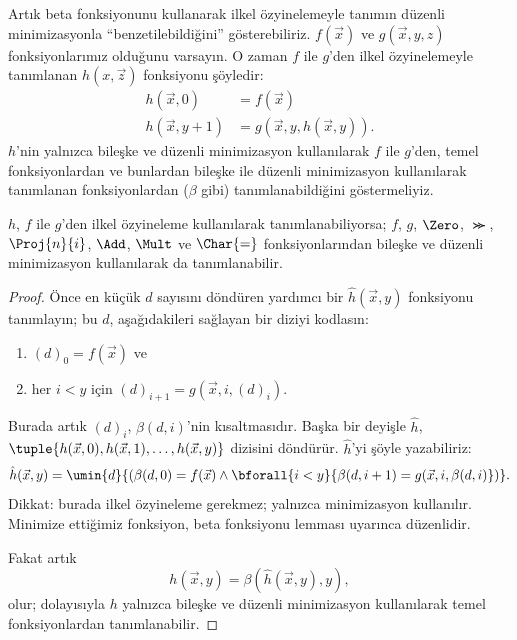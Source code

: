 \documentclass[../../../include/open-logic-section]{subfiles}
\begin{document}

Artık beta fonksiyonunu kullanarak ilkel özyinelemeyle tanımın düzenli
minimizasyonla ``benzetilebildiğini'' gösterebiliriz. $f(\vec x)$ ve
$g(\vec x,y,z)$ fonksiyonlarımız olduğunu varsayın. O zaman $f$ ile $g$'den
ilkel özyinelemeyle tanımlanan $h(x,\vec z)$ fonksiyonu şöyledir:
\begin{align*}
h(\vec x, 0) & =  f(\vec x) \\
h(\vec x, y+1) & =  g(\vec x, y, h(\vec x, y)).
\end{align*}
$h$'nin yalnızca bileşke ve düzenli minimizasyon kullanılarak $f$ ile
$g$'den, temel fonksiyonlardan ve bunlardan bileşke ile düzenli minimizasyon
kullanılarak tanımlanan fonksiyonlardan ($\beta$ gibi) tanımlanabildiğini
göstermeliyiz.

\begin{lem}
$h$, $f$ ile $g$'den ilkel özyineleme kullanılarak tanımlanabiliyorsa;
$f$, $g$, $\Zero$, $\Succ$, $\Proj{n}{i}$, $\Add$, $\Mult$ ve $\Char{=}$
fonksiyonlarından bileşke ve düzenli minimizasyon kullanılarak da
tanımlanabilir.
\end{lem}

\begin{proof}
Önce en küçük $d$ sayısını döndüren yardımcı bir $\hat h(\vec x,y)$
fonksiyonu tanımlayın; bu $d$, aşağıdakileri sağlayan bir diziyi kodlasın:
\begin{enumerate}
\item $(d)_0 = f(\vec x)$ ve
\item her $i<y$ için $(d)_{i+1}=g(\vec x,i,(d)_i)$.
\end{enumerate}
Burada artık $(d)_i$, $\beta(d,i)$'nin kısaltmasıdır. Başka bir deyişle
$\hat h$, $\tuple{h(\vec x,0),h(\vec x,1),\dots,h(\vec x,y)}$ dizisini
döndürür. $\hat h$'yi şöyle yazabiliriz:
\[
\hat h(\vec x, y) = \umin{d}{(\beta(d,0) = f(\vec x) \land \bforall{i <
  y}{\beta(d,i+1) = g(\vec x, i,\beta(d,i)})}.
\]
Dikkat: burada ilkel özyineleme gerekmez; yalnızca minimizasyon kullanılır.
Minimize ettiğimiz fonksiyon,  beta fonksiyonu lemması
uyarınca düzenlidir.

Fakat artık
\[
h(\vec x, y) = \beta(\hat h(\vec x, y), y),
\]
olur; dolayısıyla $h$ yalnızca bileşke ve düzenli minimizasyon kullanılarak
temel fonksiyonlardan tanımlanabilir.
\end{proof}
\end{document}
